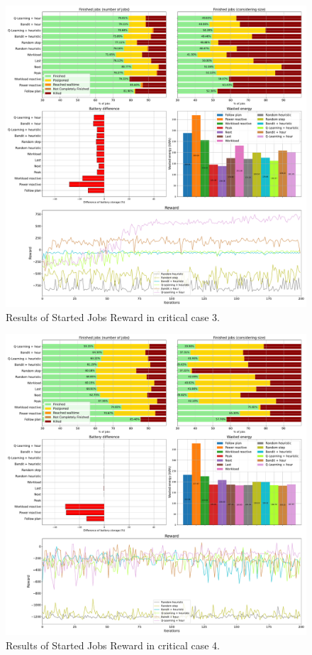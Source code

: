 \begin{figure}[!htb]
    \centering
    \includegraphics[scale=0.29]{Images/Learning_compensations/reward_started_profile_worst_workload_1_with_noise_state_delta.pdf}
    \caption{Results of Started Jobs Reward in critical case 3.}
    \label{fig:started_reward_results_critical_3}
\end{figure}

\begin{figure}[!htb]
    \centering
    \includegraphics[scale=0.29]{Images/Learning_compensations/reward_started_profile_worst_workload_2_with_noise_state_delta.pdf}
    \caption{Results of Started Jobs Reward in critical case 4.}
    \label{fig:started_reward_results_critical_4}
\end{figure}

